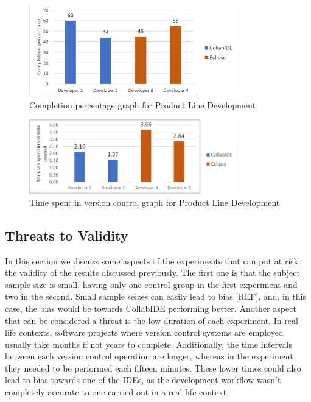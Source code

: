 \begin{figure}[htbp]
  \centering
  \includegraphics[width=0.8\textwidth]{img/completionProductLine}
  \caption{Completion percentage graph for Product Line Development}
  \label{fig:completionProductLine}
\end{figure}

\begin{figure}[htbp]
  \centering
  \includegraphics[width=0.8\textwidth]{img/versionControlProductLine}
  \caption{Time spent in version control graph for Product Line Development}
  \label{fig:versionControlProductLine}
\end{figure}

\subsection{Threats to Validity}
In this section we discuss some aspects of the experiments that can put at risk the validity of the results discussed previously. The first one is that the subject sample size is small, having only one control group in the first experiment and two in the second. Small sample seizes can easily lead to bias [REF], and, in this case, the bias would be towards CollabIDE performing better. Another aspect that can be considered a threat is the low duration of each experiment. In real life contexts, software projects where version control systems are employed usually take months if not years to complete. Additionally, the time intervals between each version control operation are longer, whereas in the experiment they needed to be performed each fifteen minutes. These lower times could also lead to bias towards one of the IDEs, as the development workflow wasn’t completely accurate to one carried out in a real life context. 


\endinput